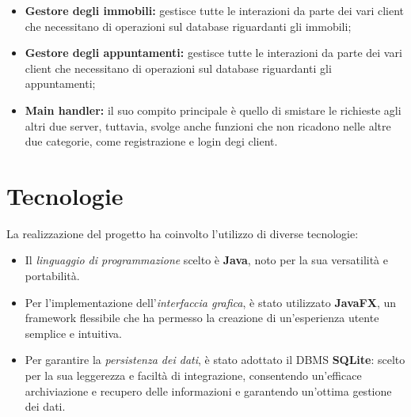 \begin{itemize}
\item \textbf{Gestore degli immobili:} gestisce tutte le interazioni da parte dei vari client che necessitano di operazioni sul database riguardanti gli immobili; 
\item \textbf{Gestore degli appuntamenti:} gestisce tutte le interazioni da parte dei vari client che necessitano di operazioni sul database riguardanti gli appuntamenti; 
\item \textbf{Main handler:} il suo compito principale è quello di smistare le richieste agli altri due server, tuttavia, svolge anche funzioni che non ricadono nelle altre due categorie, come registrazione e login degi client.
\end{itemize}

\section{Tecnologie}
\noindent La realizzazione del progetto ha coinvolto l'utilizzo di diverse tecnologie:
\begin{itemize}
    \item Il \textit{linguaggio di programmazione} scelto è \textbf{Java}, noto per la sua versatilità e portabilità.
    \item Per l'implementazione dell'\textit{interfaccia grafica}, è stato utilizzato \textbf{JavaFX}, un framework flessibile che ha permesso la creazione di un'esperienza utente semplice e intuitiva.
    \item Per garantire la \textit{persistenza dei dati}, è stato adottato il DBMS \textbf{SQLite}: scelto per la sua leggerezza e faciltà di integrazione, consentendo un'efficace archiviazione e recupero delle informazioni e garantendo un'ottima gestione dei dati.
\end{itemize}
